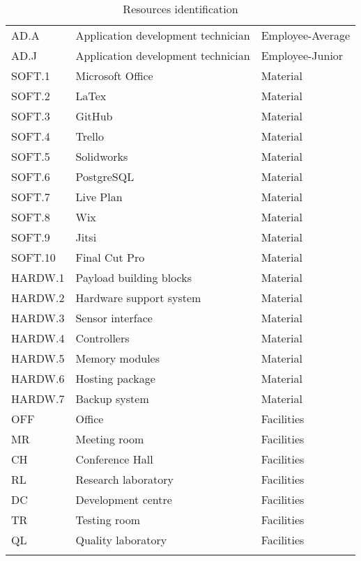 \begin{longtable}[H]{l l l}
	AD.A&Application development technician&Employee-Average\\
	AD.J&Application development technician&Employee-Junior\\
	SOFT.1&Microsoft Office&Material\\
	SOFT.2&LaTex&Material\\
	SOFT.3&GitHub&Material\\
	SOFT.4&Trello&Material\\
	SOFT.5&Solidworks&Material\\
	SOFT.6&PostgreSQL&Material\\
	SOFT.7&Live Plan&Material\\
	SOFT.8&Wix&Material\\
	SOFT.9&Jitsi&Material\\
	SOFT.10&Final Cut Pro&Material\\
	HARDW.1&Payload building blocks&Material\\
	HARDW.2&Hardware support system&Material\\
	HARDW.3&Sensor interface&Material\\
	HARDW.4&Controllers&Material\\
	HARDW.5&Memory modules&Material\\
	HARDW.6&Hosting package&Material\\
	HARDW.7&Backup system&Material\\
	OFF& Office & Facilities\\
	MR& Meeting room& Facilities\\
	CH& Conference Hall& Facilities\\
	RL & Research laboratory & Facilities\\
	DC & Development centre & Facilities\\
	TR& Testing room & Facilities\\
	QL& Quality laboratory& Facilities\\
	
	\bottomrule[2pt]
	
	\caption{Resources identification}
	\label{table_resourcesidentification}	
\end{longtable}